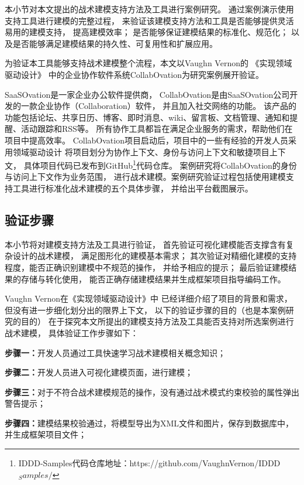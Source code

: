 本小节对本文提出的战术建模支持方法及工具进行案例研究。
通过案例演示使用支持工具进行建模的完整过程，
来验证该建模支持方法和工具是否能够提供灵活易用的建模支持，
提高建模效率；
是否能够保证建模结果的标准化、规范化；
以及是否能够满足建模结果的持久性、可复用性和扩展应用。

为验证本工具能够支持战术建模整个流程，本文以Vaughn Vernon的
《实现领域驱动设计》\cite{vernon2013implementing}
中的企业协作软件系统CollabOvation为研究案例展开验证。

SaaSOvation是一家企业办公软件提供商，
CollabOvation是由SaaSOvation公司开发的一款企业协作（Collaboration）软件，
并且加入社交网络的功能。
该产品的功能包括论坛、共享日历、博客、即时消息、wiki、留言板、文档管理、通知和提醒、活动跟踪和RSS等。
所有协作工具都旨在满足企业服务的需求，帮助他们在项目中提高效率。
CollabOvation项目启动后，项目中的一些有经验的开发人员采用领域驱动设计
将项目划分为协作上下文、身份与访问上下文和敏捷项目上下文，
具体项目代码已发布到GitHub\footnote{IDDD-Samples代码仓库地址：https://github.com/VaughnVernon/IDDD$_Samples/$}代码仓库。
案例研究将CollabOvation的身份与访问上下文作为业务范围，
进行战术建模。案例研究验证过程包括使用建模支持工具进行标准化战术建模的五个具体步骤，
并给出平台截图展示。



\subsection{验证步骤}

本小节将对建模支持方法及工具进行验证，
首先验证可视化建模能否支撑含有复杂设计的战术建模，
满足图形化的建模基本需求；
其次验证对精细化建模的支持程度，能否正确识别建模中不规范的操作，
并给予相应的提示；
最后验证建模结果的存储与转化使用，
能否正确存储建模结果并生成框架项目指导编码工作。

Vaughn Vernon在《实现领域驱动设计》\cite{vernon2013implementing}中
已经详细介绍了项目的背景和需求，
但没有进一步细化划分出的限界上下文，
以下的验证步骤的目的（也是本案例研究的目的）
在于探究本文所提出的建模支持方法及工具能否支持对所选案例进行战术建模，
具体验证工作步骤如下：

\textbf{步骤一：}开发人员通过工具快速学习战术建模相关概念知识；

\textbf{步骤二：}开发人员进入可视化建模页面，进行建模；

\textbf{步骤三：}对于不符合战术建模规范的操作，没有通过战术模式约束校验的属性弹出警告提示；

\textbf{步骤四：}建模结果校验通过，将模型导出为XML文件和图片，保存到数据库中，并生成框架项目文件；

